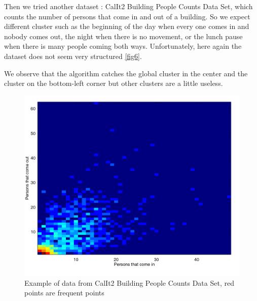 \documentclass{article}
\begin{document}
Then we tried another dataset : CalIt2 Building People Counts Data Set, which counts the number of persons that come in and out of a building. So we expect different cluster such as the beginning of the day when every one comes in and nobody comes out, the night when there is no movement, or the lunch pause when there is many people coming both ways. Unfortunately, here again the dataset does not seem very structured \ref{fig6}.
\newline

We observe that the algorithm catches the global cluster in the center and the cluster on the bottom-left corner but other clusters are a little useless.
\clearpage

\begin{figure}[h]
	\begin{minipage}[b]{.49\linewidth}
		\vspace{10pt}
		\includegraphics[width=1.0\textwidth]{building.png}
		\begin{center}
			\caption{Example of data from CalIt2 Building People Counts Data Set, red points are frequent points}
		\end{center}\medskip
	\end{minipage}
	\hfill
	\begin{minipage}[b]{0.49\linewidth}

\end{minipage}
\end{figure}
\end{document}
